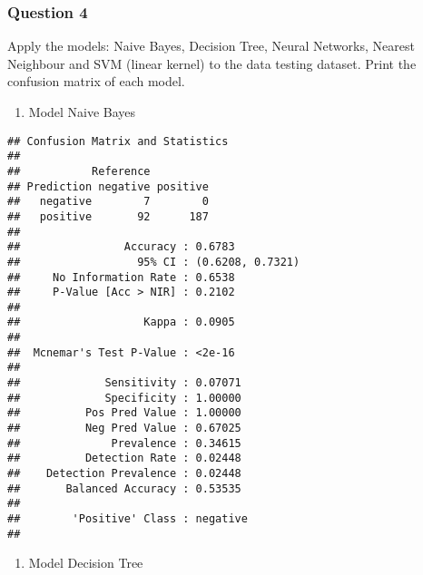 \documentclass[]{article}
\newenvironment{Shaded}{\begin{snugshade}}{\end{snugshade}}
\newcommand{\DataTypeTok}[1]{\textcolor[rgb]{0.13,0.29,0.53}{#1}}
\newcommand{\KeywordTok}[1]{\textcolor[rgb]{0.13,0.29,0.53}{\textbf{#1}}}
\newcommand{\NormalTok}[1]{#1}
\newcommand{\OperatorTok}[1]{\textcolor[rgb]{0.81,0.36,0.00}{\textbf{#1}}}
\newcommand{\StringTok}[1]{\textcolor[rgb]{0.31,0.60,0.02}{#1}}
\providecommand{\tightlist}{%
  \setlength{\itemsep}{0pt}\setlength{\parskip}{0pt}}
\begin{document}
\hypertarget{question-4}{%
\subsubsection{Question 4}\label{question-4}}

Apply the models: Naive Bayes, Decision Tree, Neural Networks, Nearest
Neighbour and SVM (linear kernel) to the data testing dataset. Print the
confusion matrix of each model.

\begin{enumerate}
\def\labelenumi{\arabic{enumi}.}
\tightlist
\item
  Model Naive Bayes
\end{enumerate}

\begin{Shaded}
\end{Shaded}

\begin{verbatim}
## Confusion Matrix and Statistics
## 
##           Reference
## Prediction negative positive
##   negative        7        0
##   positive       92      187
##                                           
##                Accuracy : 0.6783          
##                  95% CI : (0.6208, 0.7321)
##     No Information Rate : 0.6538          
##     P-Value [Acc > NIR] : 0.2102          
##                                           
##                   Kappa : 0.0905          
##                                           
##  Mcnemar's Test P-Value : <2e-16          
##                                           
##             Sensitivity : 0.07071         
##             Specificity : 1.00000         
##          Pos Pred Value : 1.00000         
##          Neg Pred Value : 0.67025         
##              Prevalence : 0.34615         
##          Detection Rate : 0.02448         
##    Detection Prevalence : 0.02448         
##       Balanced Accuracy : 0.53535         
##                                           
##        'Positive' Class : negative        
## 
\end{verbatim}

\begin{enumerate}
\def\labelenumi{\arabic{enumi}.}
\setcounter{enumi}{1}
\tightlist
\item
  Model Decision Tree
\end{enumerate}
\end{document}
